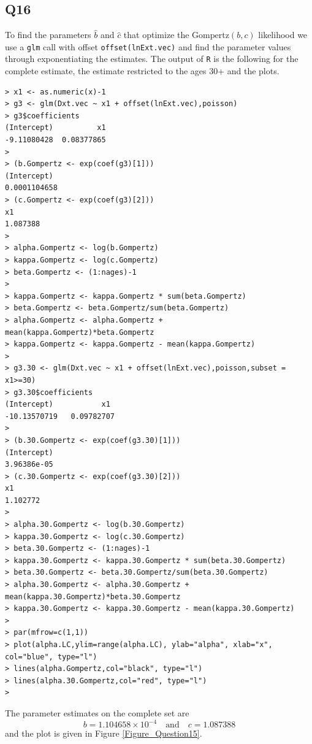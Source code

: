 \documentclass[11pt]{article}
\begin{document}
\subsection*{Q16}

To find the parameters $\hat{b}$ and $\hat{c}$ that optimize the $\text{Gompertz}(b,c)$ likelihood we use a \verb|glm| call with offset \verb|offset(lnExt.vec)| and find the parameter values through exponentiating the estimates. The output of \verb|R| is the following for the complete estimate, the estimate restricted to the ages 30+ and the plots.
\begin{verbatim}
> x1 <- as.numeric(x)-1
> g3 <- glm(Dxt.vec ~ x1 + offset(lnExt.vec),poisson)
> g3$coefficients
(Intercept)          x1 
-9.11080428  0.08377865 
> 
> (b.Gompertz <- exp(coef(g3)[1]))
(Intercept) 
0.0001104658 
> (c.Gompertz <- exp(coef(g3)[2]))
x1 
1.087388 
> 
> alpha.Gompertz <- log(b.Gompertz)
> kappa.Gompertz <- log(c.Gompertz)
> beta.Gompertz <- (1:nages)-1
> 
> kappa.Gompertz <- kappa.Gompertz * sum(beta.Gompertz)
> beta.Gompertz <- beta.Gompertz/sum(beta.Gompertz)
> alpha.Gompertz <- alpha.Gompertz + mean(kappa.Gompertz)*beta.Gompertz
> kappa.Gompertz <- kappa.Gompertz - mean(kappa.Gompertz)
> 
> g3.30 <- glm(Dxt.vec ~ x1 + offset(lnExt.vec),poisson,subset = x1>=30)
> g3.30$coefficients
(Intercept)           x1 
-10.13570719   0.09782707 
>   
> (b.30.Gompertz <- exp(coef(g3.30)[1]))
(Intercept) 
3.96386e-05 
> (c.30.Gompertz <- exp(coef(g3.30)[2]))
x1 
1.102772 
> 
> alpha.30.Gompertz <- log(b.30.Gompertz)
> kappa.30.Gompertz <- log(c.30.Gompertz)
> beta.30.Gompertz <- (1:nages)-1
> kappa.30.Gompertz <- kappa.30.Gompertz * sum(beta.30.Gompertz)
> beta.30.Gompertz <- beta.30.Gompertz/sum(beta.30.Gompertz)
> alpha.30.Gompertz <- alpha.30.Gompertz + mean(kappa.30.Gompertz)*beta.30.Gompertz
> kappa.30.Gompertz <- kappa.30.Gompertz - mean(kappa.30.Gompertz)
> 
> par(mfrow=c(1,1))
> plot(alpha.LC,ylim=range(alpha.LC), ylab="alpha", xlab="x", col="blue", type="l")
> lines(alpha.Gompertz,col="black", type="l")
> lines(alpha.30.Gompertz,col="red", type="l")
>
\end{verbatim}
The parameter estimates on the complete set are
\begin{equation}
b = 1.104658 \times 10^{-4} \quad \text{and} \quad c = 1.087388 
\end{equation}
and the plot is given in Figure \ref{Figure_Question15}.
\end{document}
